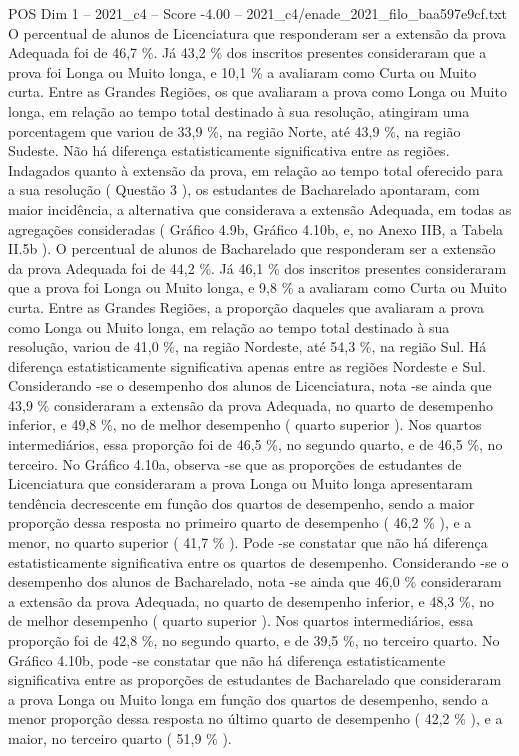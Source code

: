 \begin{textsample}{POS Dim 1 – 2021\_c4 – Score -4.00 – 2021\_c4/enade\_2021\_filo\_baa597e9cf.txt}
O percentual de alunos de Licenciatura que responderam ser a extensão da prova Adequada foi de 46,7 \%.
Já 43,2 \% dos inscritos presentes consideraram que a prova foi Longa ou Muito longa, e 10,1 \% a avaliaram como Curta ou Muito curta.
Entre as Grandes Regiões, os que avaliaram a prova como Longa ou Muito longa, em relação ao tempo total destinado à sua resolução, atingiram uma porcentagem que variou de 33,9 \%, na região Norte, até 43,9 \%, na região Sudeste.
Não há diferença estatisticamente significativa entre as regiões.
Indagados quanto à extensão da prova, em relação ao tempo total oferecido para a sua resolução ( Questão 3 ), os estudantes de Bacharelado apontaram, com maior incidência, a alternativa que considerava a extensão Adequada, em todas as agregações consideradas ( Gráfico 4.9b, Gráfico 4.10b, e, no Anexo IIB, a Tabela II.5b ).
O percentual de alunos de Bacharelado que responderam ser a extensão da prova Adequada foi de 44,2 \%.
Já 46,1 \% dos inscritos presentes consideraram que a prova foi Longa ou Muito longa, e 9,8 \% a avaliaram como Curta ou Muito curta.
Entre as Grandes Regiões, a proporção daqueles que avaliaram a prova como Longa ou Muito longa, em relação ao tempo total destinado à sua resolução, variou de 41,0 \%, na região Nordeste, até 54,3 \%, na região Sul.
Há diferença estatisticamente significativa apenas entre as regiões Nordeste e Sul.
Considerando -se o desempenho dos alunos de Licenciatura, nota -se ainda que 43,9 \% consideraram a extensão da prova Adequada, no quarto de desempenho inferior, e 49,8 \%, no de melhor desempenho ( quarto superior ).
Nos quartos intermediários, essa proporção foi de 46,5 \%, no segundo quarto, e de 46,5 \%, no terceiro.
No Gráfico 4.10a, observa -se que as proporções de estudantes de Licenciatura que consideraram a prova Longa ou Muito longa apresentaram tendência decrescente em função dos quartos de desempenho, sendo a maior proporção dessa resposta no primeiro quarto de desempenho ( 46,2 \% ), e a menor, no quarto superior ( 41,7 \% ).
Pode -se constatar que não há diferença estatisticamente significativa entre os quartos de desempenho.
Considerando -se o desempenho dos alunos de Bacharelado, nota -se ainda que 46,0 \% consideraram a extensão da prova Adequada, no quarto de desempenho inferior, e 48,3 \%, no de melhor desempenho ( quarto superior ).
Nos quartos intermediários, essa proporção foi de 42,8 \%, no segundo quarto, e de 39,5 \%, no terceiro quarto.
No Gráfico 4.10b, pode -se constatar que não há diferença estatisticamente significativa entre as proporções de estudantes de Bacharelado que consideraram a prova Longa ou Muito longa em função dos quartos de desempenho, sendo a menor proporção dessa resposta no último quarto de desempenho ( 42,2 \% ), e a maior, no terceiro quarto ( 51,9 \% ).

\end{textsample}

